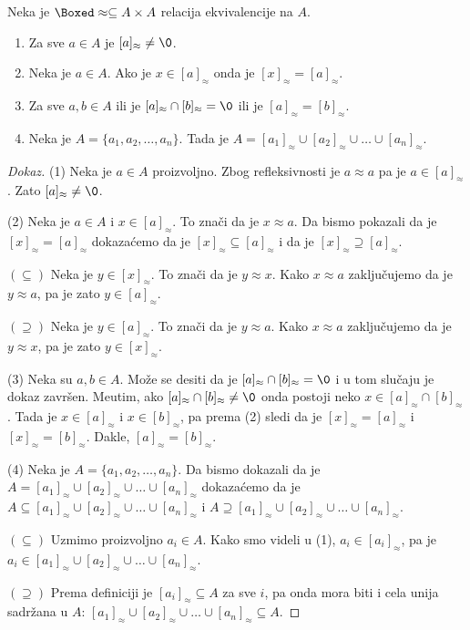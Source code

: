 \begin{THM}\label{ft07.thm.ekviv}
  Neka je $\Boxed\approx \subseteq A \times A$ relacija ekvivalencije na $A$.
  \begin{enumerate}
  \item
    Za sve $a \in A$ je $[a]_\approx \ne \0$.
  \item
    Neka je $a \in A$. Ako je $x \in [a]_\approx$ onda je $[x]_\approx = [a]_\approx$.
  \item
    Za sve $a, b \in A$ ili je $[a]_\approx \cap [b]_\approx = \0$ ili je $[a]_\approx = [b]_\approx$.
  \item
    Neka je $A = \{a_1, a_2, \ldots, a_n\}$. Tada je $A = [a_1]_\approx \cup [a_2]_\approx \cup \ldots \cup [a_n]_\approx$.
  \end{enumerate}
\end{THM}
\begin{proof}[Dokaz]
  (1)
  Neka je $a \in A$ proizvoljno. Zbog refleksivnosti je $a \approx a$ pa je $a \in [a]_\approx$. Zato
  $[a]_\approx \ne \0$.
  
  \medskip
  
  (2)
  Neka je $a \in A$ i $x \in [a]_\approx$. To zna\v ci da je $x \approx a$. Da bismo pokazali da je
  $[x]_\approx = [a]_\approx$ dokaza\'cemo da je $[x]_\approx \subseteq [a]_\approx$ i da je
  $[x]_\approx \supseteq [a]_\approx$.
  
  $(\subseteq)$
  Neka je $y \in [x]_\approx$. To zna\v ci da je $y \approx x$. Kako $x \approx a$ zaklju\v cujemo da je
  $y \approx a$, pa je zato $y \in [a]_\approx$.

  $(\supseteq)$
  Neka je $y \in [a]_\approx$. To zna\v ci da je $y \approx a$. Kako $x \approx a$ zaklju\v cujemo da je
  $y \approx x$, pa je zato $y \in [x]_\approx$.
  
  \medskip
  
  (3)
  Neka su $a, b \in A$. Mo\v ze se desiti da je $[a]_\approx \cap [b]_\approx = \0$ i u tom slu\v caju je dokaz
  zavr\v sen. Me\dj utim, ako $[a]_\approx \cap [b]_\approx \ne \0$ onda postoji neko $x \in [a]_\approx \cap [b]_\approx$.
  Tada je $x \in [a]_\approx$ i $x \in [b]_\approx$, pa prema (2) sledi da je
  $[x]_\approx = [a]_\approx$ i $[x]_\approx = [b]_\approx$. Dakle, $[a]_\approx = [b]_\approx$.
  
  \medskip
  
  (4)
  Neka je $A = \{a_1, a_2, \ldots, a_n\}$. Da bismo dokazali da je
  $A = [a_1]_\approx \cup [a_2]_\approx \cup \ldots \cup [a_n]_\approx$ dokaza\'cemo da je
  $A \subseteq [a_1]_\approx \cup [a_2]_\approx \cup \ldots \cup [a_n]_\approx$ i
  $A \supseteq [a_1]_\approx \cup [a_2]_\approx \cup \ldots \cup [a_n]_\approx$.
  
  $(\subseteq)$
  Uzmimo proizvoljno $a_i \in A$. Kako smo videli u (1), $a_i \in [a_i]_\approx$, pa je
  $a_i \in [a_1]_\approx \cup [a_2]_\approx \cup \ldots \cup [a_n]_\approx$.
  
  $(\supseteq)$
  Prema definiciji je $[a_i]_\approx \subseteq A$ za sve $i$, pa onda mora biti i cela unija sadr\v zana u $A$:
  $[a_1]_\approx \cup [a_2]_\approx \cup \ldots \cup [a_n]_\approx \subseteq A$.
\end{proof}

